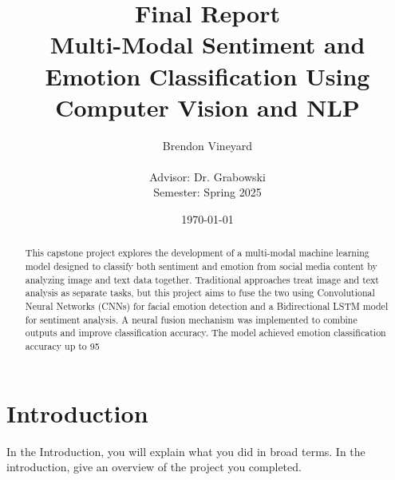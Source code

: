 \documentclass[titlepage]{article}
\begin{document}
\title{Final Report\\Multi-Modal Sentiment and Emotion Classification Using Computer Vision and NLP} 
\author{Brendon Vineyard\\\\Advisor: Dr. Grabowski\\Semester: Spring 2025} 
\date{\today}
\maketitle

\begin{abstract}
This capstone project explores the development of a multi-modal machine learning model designed to classify both sentiment and emotion from social media content by analyzing image and text data together. Traditional approaches treat image and text analysis as separate tasks, but this project aims to fuse the two using Convolutional Neural Networks (CNNs) for facial emotion detection and a Bidirectional LSTM model for sentiment analysis. A neural fusion mechanism was implemented to combine outputs and improve classification accuracy. The model achieved emotion classification accuracy up to 95%
\end{abstract}


\section{Introduction}
In the Introduction, you will explain what you did in broad terms. In the introduction, give an overview of the project you completed.
\end{document}

